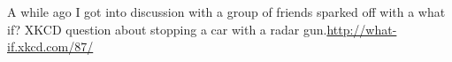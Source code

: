 \documentclass[a4paper, 12pt]{article}
\begin{document}
A while ago I got into discussion with a group of friends sparked off with a what if? XKCD question about stopping a car with a radar gun.\url{http://what-if.xkcd.com/87/}
\end{document}
